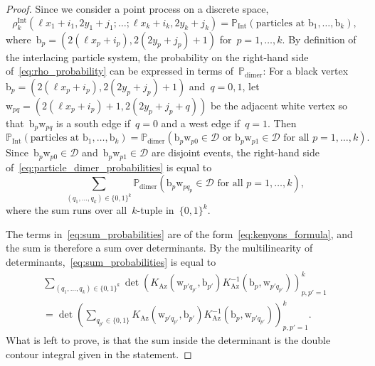\documentclass[11pt]{article}
\theoremstyle{plain}
\theoremstyle{definition}
\numberwithin{equation}{section}
\newcommand{\PP}{\mathbb{P}}
\begin{document}
\begin{proof}
Since we consider a point process on a discrete space, 
\begin{equation}\label{eq:rho_probability}
\rho_k^{\operatorname{Int}}\left(\ell x_1+i_1,2y_1+j_1;\dots;\ell x_k+i_k,2y_k+j_k\right)
=\PP_{\operatorname{Int}}\left(\text{particles at } \mathrm b_1, \dots, \mathrm b_k\right),
\end{equation}
where~$\mathrm b_p=(2(\ell x_p+i_p),2(2y_p+j_p)+1)$ for~$p=1,\dots,k$. By definition of the interlacing particle system, the probability on the right-hand side of~\eqref{eq:rho_probability} can be expressed in terms of~$\PP_{\operatorname{dimer}}$: For a black vertex~$\mathrm b_p=(2(\ell x_p+i_p),2(2y_p+j_p)+1)$ and~$q=0,1$, let~$\mathrm w_{pq}=(2(\ell x_p+i_p)+1,2(2y_p+j_p+q))$ be the adjacent white vertex so that~$\mathrm b_p\mathrm w_{pq}$ is a south edge if~$q=0$ and a west edge if~$q=1$. Then
\begin{equation}\label{eq:particle_dimer_probabilities}
\PP_{\operatorname{Int}}\left(\text{particles at } \mathrm b_1, \dots, \mathrm b_k\right)
=
\PP_{\operatorname{dimer}}\left(\mathrm b_p \mathrm w_{p0}\in \mathcal D \text{ or } \mathrm b_p \mathrm w_{p1} \in \mathcal D \text{ for all }p=1,\dots,k\right).
\end{equation}
Since~$\mathrm b_p \mathrm w_{p0}\in \mathcal D$ and~$\mathrm b_p \mathrm w_{p1}\in \mathcal D$ are disjoint events, the right-hand side of~\eqref{eq:particle_dimer_probabilities} is equal to
\begin{equation}\label{eq:sum_probabilities}
\sum_{(q_1,\dots,q_k)\in \{0,1\}^k} \PP_{\operatorname{dimer}}\left(\mathrm b_p \mathrm w_{pq_p}\in \mathcal D \text{ for all }p=1,\dots,k\right),
\end{equation}
where the sum runs over all~$k$-tuple in~$\{0,1\}^k$.

The terms in~\eqref{eq:sum_probabilities} are of the form~\eqref{eq:kenyons_formula}, and the sum is therefore a sum over determinants. By the multilinearity of determinants,~\eqref{eq:sum_probabilities} is equal to
\begin{multline}\label{eq:sum_det}
\sum_{(q_1,\dots,q_k)\in \{0,1\}^k}
\det\left(K_\text{Az}(\mathrm w_{p'q_{p'}},\mathrm b_{p'})K_\text{Az}^{-1}(\mathrm b_p,\mathrm w_{p'q_{p'}})\right)_{p,p'=1}^k \\
=\det\left(\sum_{q_{p'}\in \{0,1\}}K_\text{Az}(\mathrm w_{p'q_{p'}},\mathrm b_{p'})K_\text{Az}^{-1}(\mathrm b_p,\mathrm w_{p'q_{p'}})\right)_{p,p'=1}^k.
\end{multline}
What is left to prove, is that the sum inside the determinant is the double contour integral given in the statement. 


\end{proof}
\end{document}
